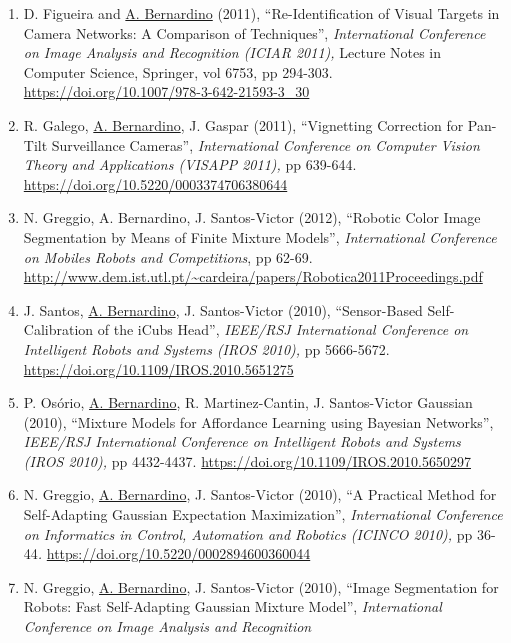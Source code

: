 \begin{enumerate}
  N. Greggio, J. Gaspar, \ul{A. Bernardino}, J. Santos-Victor (2011),
  ``Monocular vs Binocular 3D Real-Time Ball Tracking From 2d
  Ellipses'', \emph{International Conference on Informatics in Control,
  Automation and Robotics (ICINCO 2011),} pp 67-73.
  \url{https://doi.org/10.5220/0003543400670073}~~~
\item
  D. Figueira and \ul{A. Bernardino} (2011), ``Re-Identification of
  Visual Targets in Camera Networks: A Comparison of Techniques'',
  \emph{International Conference on Image Analysis and Recognition
  (ICIAR 2011),} Lecture Notes in Computer Science, Springer, vol 6753,
  pp 294-303. \url{https://doi.org/10.1007/978-3-642-21593-3_30}~
\item
  R. Galego, \ul{A. Bernardino}, J. Gaspar (2011), ``Vignetting
  Correction for Pan-Tilt Surveillance Cameras'', \emph{International
  Conference on Computer Vision Theory and Applications (VISAPP 2011),}
  pp 639-644. \url{https://doi.org/10.5220/0003374706380644}
\item
  N. Greggio, A. Bernardino, J. Santos-Victor (2012), ``Robotic Color
  Image Segmentation by Means of Finite Mixture Models'',
  \emph{International Conference on Mobiles Robots and Competitions}, pp
  62-69.
  \url{http://www.dem.ist.utl.pt/~cardeira/papers/Robotica2011Proceedings.pdf}
  ~
\item
  J. Santos, \ul{A. Bernardino}, J. Santos-Victor (2010), ``Sensor-Based
  Self-Calibration of the iCub\textquotesingle s Head'', \emph{IEEE/RSJ
  International Conference on Intelligent Robots and Systems (IROS
  2010),} pp 5666-5672. \url{https://doi.org/10.1109/IROS.2010.5651275}~
\item
  P. Osório, \ul{A. Bernardino}, R. Martinez-Cantin, J. Santos-Victor
  Gaussian (2010), ``Mixture Models for Affordance Learning using
  Bayesian Networks'', \emph{IEEE/RSJ International Conference on
  Intelligent Robots and Systems (IROS 2010),} pp 4432-4437.
  \url{https://doi.org/10.1109/IROS.2010.5650297}~
\item
  N. Greggio, \ul{A. Bernardino}, J. Santos-Victor (2010), ``A Practical
  Method for Self-Adapting Gaussian Expectation Maximization'',
  \emph{International Conference on Informatics in Control, Automation
  and Robotics (ICINCO 2010),} pp 36-44\emph{.}
  \url{https://doi.org/10.5220/0002894600360044}~
\item
  N. Greggio, \ul{A. Bernardino}, J. Santos-Victor (2010), ``Image
  Segmentation for Robots: Fast Self-Adapting Gaussian Mixture Model'',
  \emph{International Conference on Image Analysis and Recognition
}
\end{enumerate}
